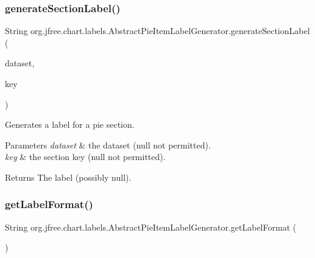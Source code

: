 \subsubsection{\texorpdfstring{generate\+Section\+Label()}{generateSectionLabel()}}
{\footnotesize\ttfamily String org.\+jfree.\+chart.\+labels.\+Abstract\+Pie\+Item\+Label\+Generator.\+generate\+Section\+Label (\begin{DoxyParamCaption}\item[{\mbox{\hyperlink{interfaceorg_1_1jfree_1_1data_1_1general_1_1_pie_dataset}{Pie\+Dataset}}}]{dataset,  }\item[{Comparable}]{key }\end{DoxyParamCaption})\hspace{0.3cm}{\ttfamily [protected]}}

Generates a label for a pie section.


\begin{DoxyParams}{Parameters}
{\em dataset} & the dataset ({\ttfamily null} not permitted). \\
\hline
{\em key} & the section key ({\ttfamily null} not permitted).\\
\hline
\end{DoxyParams}
\begin{DoxyReturn}{Returns}
The label (possibly {\ttfamily null}). 
\end{DoxyReturn}
\mbox{\label{classorg_1_1jfree_1_1chart_1_1labels_1_1_abstract_pie_item_label_generator_a0aeb620d6ae74c7a838d9906ce153465}} 
\subsubsection{\texorpdfstring{get\+Label\+Format()}{getLabelFormat()}}
{\footnotesize\ttfamily String org.\+jfree.\+chart.\+labels.\+Abstract\+Pie\+Item\+Label\+Generator.\+get\+Label\+Format (\begin{DoxyParamCaption}{ }\end{DoxyParamCaption})}

